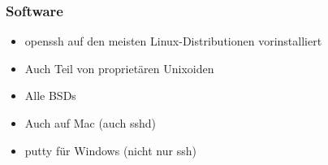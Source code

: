 \begin{frame}
\frametitle{Software}
\begin{itemize}
\item openssh auf den meisten Linux-Distributionen vorinstalliert
\pause
\item Auch Teil von proprietären Unixoiden
\pause
\item Alle BSDs
\pause
\item Auch auf Mac (auch sshd)
\pause
\item putty für Windows (nicht nur ssh)
\end{itemize}
\end{frame}